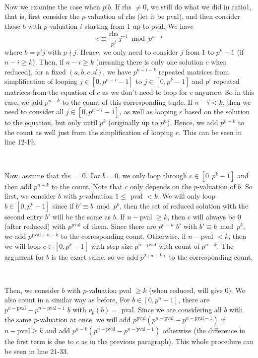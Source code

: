 \documentclass[letterpaper,12pt]{article}
\begin{document}
\

Now we examine the case when $p | b$.
If rhs $\neq 0$, we still do what we did in ratio1, that is,
first consider the $p$-valuation of rhs (let it be pval), 
and then consider those $b$ with $p$-valuation $i$ starting from 1 up to pval.
We have 
\[
c \equiv \frac{\text{rhs}}{p^i} j^{-1} \bmod p^{n - i}
\]
where $b = p^i j$ with $p \nmid j$.
Hence, we only need to consider $j$ from $1$ to $p^k-1$ (if $n-i \geq k$).
Then, if $n-i \geq k$ (meaning there is only one solution $c$ when reduced), for a fixed $(a, b, c, d)$, 
we have $p^{n-i-k}$ repeated matrices from simplification of 
looping $j \in [0, p^{n-i}-1]$ to $j \in [0, p^{k}-1]$
and $p^i$ repeated matrices from the equation of $c$ as we don't need to loop for $c$ anymore.
So in this case, we add $p^{n-k}$ to the count of this corresponding tuple.
If $n-i < k$, then we need to consider all $j \in [0, p^{n-i}-1]$,
as well as looping $c$ based on the solution to the equation, but only until $p^k$ (originally up to $p^n$).
Hence, we add $p^{n-k}$ to the count as well just from the simplification of looping $c$.
This can be seen in line 12-19.

\

Now, assume that rhs $= 0$.
For $b=0$, we only loop through $c \in [0, p^k-1]$
and then add $p^{n-k}$ to the count.
Note that $c$ only depends on the $p$-valuation of $b$.
So first, we consider $b$ with $p$-valuation $1 \leq $ pval $ < k$.
We will only loop $b \in [0, p^k-1]$ since if 
$b' \equiv b \bmod p^k$, then the set of reduced solution with the second entry $b'$
will be the same as $b$.
If $n-$pval $\geq k$, then $c$ will always be 0 (after reduced) with $p^{\text{pval}}$ of them.
Since there are $p^{n-k}$ $b'$ with $b' \equiv b \bmod p^k$,
we add $p^{\text{pval}+n-k}$ to the corresponding count.
Otherwise, if $n-$pval $<k$, then we will loop 
$c\in [0, p^k-1]$ with step size $p^{n-\text{pval}}$ with count of $p^{n-k}$.
The argument for $b$ is the exact same, so we add $p^{2(n-k)}$
to the corresponding count.

\

Then, we consider $b$ with $p$-valuation pval $\geq k$ 
(when reduced, will give 0). We also count in a similar way as before, 
For $b \in [0, p^n-1]$, there are $p^{n-\text{pval}} - p^{n-\text{pval}-1}$
$b$ with $v_p(b) = $ pval.
Since we are considering all $b$ with the same $p$-valuation at once, 
we will add $p^{\text{pval}} (p^{n-\text{pval}} - p^{n-\text{pval}-1})$
if $n-\text{pval} \geq k$ and add 
$p^{n-k} (p^{n-\text{pval}} - p^{n-\text{pval}-1})$ otherwise
(the difference in the first term is due to $c$ as in the previous paragraph).
This whole procedure can be seen in line 21-33.
\end{document}
